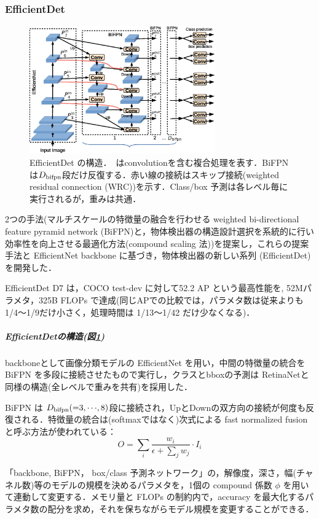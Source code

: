\documentclass[twocolumn]{jsarticle} %
\begin{document}
\subsubsection{EfficientDet \cite{TPL20}}
\begin{figure}[tb]
    \begin{center}
        \includegraphics[width=8cm,clip]{fig/archi_EfficientDet.eps}
    \end{center}
    \caption{ EfficientDet の構造．\ はconvolutionを含む複合処理を表す．BiFPNは$D_{\rm bifpn}$段だけ反復する．赤い線の接続はスキップ接続(weighted residual connection (WRC))を示す．Class/box 予測は各レベル毎に実行されるが，重みは共通．}
    \label{fig:archi_EfficientDet}
\end{figure}
2つの手法(マルチスケールの特徴量の融合を行わせる weighted bi-directional feature pyramid network (BiFPN)と，物体検出器の構造設計選択を系統的に行い効率性を向上させる最適化方法(compound scaling 法))を提案し，これらの提案手法と EfficientNet backbone \cite{TanLe19} に基づき，物体検出器の新しい系列 (EfficientDet)を開発した．

EfficientDet D7 は，COCO test-dev に対して52.2 AP という最高性能を, 52Mパラメタ，325B FLOPs で達成(同じAPでの比較では，パラメタ数は従来よりも1/4〜1/9だけ小さく，処理時間は 1/13〜1/42 だけ少なくなる)．

\subparagraph{EfficientDetの構造(図\ref{fig:archi_EfficientDet})}
backboneとして画像分類モデルの EfficientNet\cite{TanLe19} を用い，中間の特徴量の統合を BiFPN を多段に接続させたもので実行し，クラスとbboxの予測は RetinaNet\cite{LGGHD17}と同様の構造(全レベルで重みを共有)を採用した．

BiFPN は $D_{\rm bifpn} ({=}3,{\cdots},8)$段に接続され，UpとDownの双方向の接続が何度も反復される．特徴量の統合は(softmaxではなく)次式による fast normalized fusion と呼ぶ方法が使われている：
$$ O = \sum_i\frac{w_i}{\epsilon + \sum_jw_j}\cdot I_i $$

「backbone, BiFPN， box/class 予測ネットワーク」の，解像度，深さ，幅(チャネル数)等のモデルの規模を決めるパラメタを，1個の compound 係数 $\phi$ を用いて連動して変更する．メモリ量と FLOPs の制約内で，accuracy を最大化するパラメタ数の配分を求め，それを保ちながらモデル規模を変更することができる．
\end{document}
